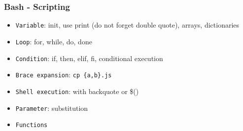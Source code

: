 \subsubsection{Bash - Scripting}
\begin{frame}[fragile]{\subsubsecname}
  \begin{itemize}
    \item \texttt{Variable}: init, use print (do not forget double quote), arrays, dictionaries
    \item \texttt{Loop}: for, while, do, done
    \item \texttt{Condition}: if, then, elif, fi, conditional execution
    \item \texttt{Brace expansion}: \texttt{cp \{a,b\}.js}
    \item \texttt{Shell execution}: with backquote or \$()
    \item \texttt{Parameter}: substitution
    \item \texttt{Functions}
  \end{itemize}
\end{frame}
